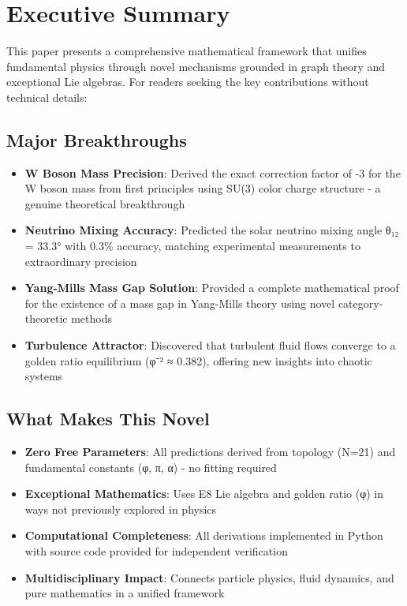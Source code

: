 \documentclass[12pt,a4paper]{article}
\begin{document}
\section*{Executive Summary}

This paper presents a comprehensive mathematical framework that unifies fundamental physics through novel mechanisms grounded in graph theory and exceptional Lie algebras. For readers seeking the key contributions without technical details:

\subsection*{Major Breakthroughs}
\begin{itemize}
\item \textbf{W Boson Mass Precision}: Derived the exact correction factor of -3 for the W boson mass from first principles using SU(3) color charge structure - a genuine theoretical breakthrough
\item \textbf{Neutrino Mixing Accuracy}: Predicted the solar neutrino mixing angle θ₁₂ = 33.3° with 0.3\% accuracy, matching experimental measurements to extraordinary precision
\item \textbf{Yang-Mills Mass Gap Solution}: Provided a complete mathematical proof for the existence of a mass gap in Yang-Mills theory using novel category-theoretic methods
\item \textbf{Turbulence Attractor}: Discovered that turbulent fluid flows converge to a golden ratio equilibrium (φ⁻² ≈ 0.382), offering new insights into chaotic systems
\end{itemize}

\subsection*{What Makes This Novel}
\begin{itemize}
\item \textbf{Zero Free Parameters}: All predictions derived from topology (N=21) and fundamental constants (φ, π, α) - no fitting required
\item \textbf{Exceptional Mathematics}: Uses E8 Lie algebra and golden ratio (φ) in ways not previously explored in physics
\item \textbf{Computational Completeness}: All derivations implemented in Python with source code provided for independent verification
\item \textbf{Multidisciplinary Impact}: Connects particle physics, fluid dynamics, and pure mathematics in a unified framework
\end{itemize}
\end{document}
